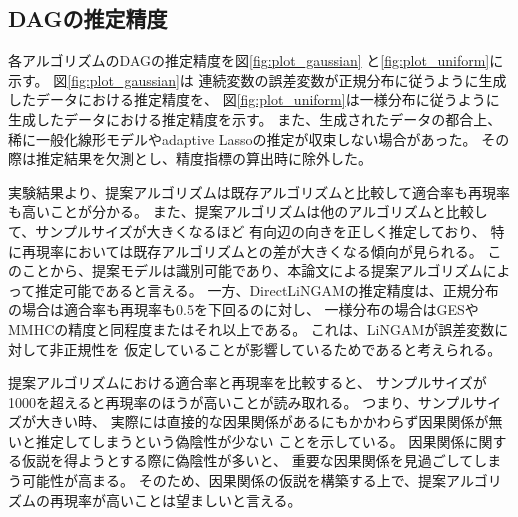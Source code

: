 
\subsection{DAGの推定精度}

各アルゴリズムのDAGの推定精度を図\ref{fig:plot_gaussian}
と\ref{fig:plot_uniform}に示す。
図\ref{fig:plot_gaussian}は
連続変数の誤差変数が正規分布に従うように生成したデータにおける推定精度を、
図\ref{fig:plot_uniform}は一様分布に従うように生成したデータにおける推定精度を示す。
また、生成されたデータの都合上、
稀に一般化線形モデルやadaptive Lassoの推定が収束しない場合があった。
その際は推定結果を欠測とし、精度指標の算出時に除外した。

実験結果より、提案アルゴリズムは既存アルゴリズムと比較して適合率も再現率も高いことが分かる。
また、提案アルゴリズムは他のアルゴリズムと比較して、サンプルサイズが大きくなるほど
有向辺の向きを正しく推定しており、
特に再現率においては既存アルゴリズムとの差が大きくなる傾向が見られる。
このことから、提案モデルは識別可能であり、本論文による提案アルゴリズムによって推定可能であると言える。
一方、DirectLiNGAMの推定精度は、正規分布の場合は適合率も再現率も0.5を下回るのに対し、
一様分布の場合はGESやMMHCの精度と同程度またはそれ以上である。
これは、LiNGAM\cite{Shimizu2011-pd}が誤差変数に対して非正規性を
仮定していることが影響しているためであると考えられる。

提案アルゴリズムにおける適合率と再現率を比較すると、
サンプルサイズが1000を超えると再現率のほうが高いことが読み取れる。
つまり、サンプルサイズが大きい時、
実際には直接的な因果関係があるにもかかわらず因果関係が無いと推定してしまうという偽陰性が少ない
ことを示している。
因果関係に関する仮説を得ようとする際に偽陰性が多いと、
重要な因果関係を見過ごしてしまう可能性が高まる。
そのため、因果関係の仮説を構築する上で、提案アルゴリズムの再現率が高いことは望ましいと言える。

